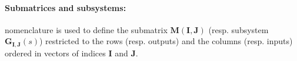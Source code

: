 \paragraph{Submatrices and subsystems:} \matlab  nomenclature is used to define the submatrix $\mathbf{M}(\mathbf{I},\mathbf{J})$ (resp. subsystem $\mathbf{G}_{\mathbf{I},\mathbf{J}}(s)$) restricted to the rows (resp. outputs) and the columns (resp. inputs) ordered in vectors of indices $\mathbf{I}$ and $\mathbf{J}$. 
%

